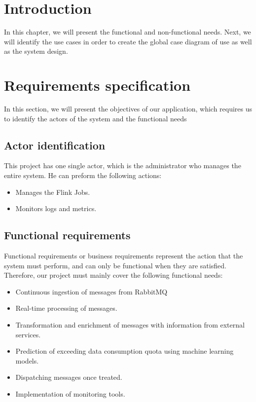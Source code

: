 
\section{Introduction}
In this chapter, we will present the functional and non-functional needs.
Next, we will identify the use cases in order to create the global case diagram of use as well as the system design.


\section{Requirements specification}

In this section, we will present the objectives of our application, which requires us to identify the actors of the system and the functional needs

\subsection{Actor identification}
This project has one single actor, which is the administrator who manages the entire system. He can preform the following actions:
\begin{itemize}
    \item[-] Manages the Flink Jobs.
    \item[-] Monitors logs and metrics.
\end{itemize}

\subsection{Functional requirements}

Functional requirements or business requirements represent the action that the system must perform, and can only be functional when they are satisfied.
Therefore, our project must mainly cover the following functional needs:
\begin{itemize}
    \item Continuous ingestion of messages from RabbitMQ
    \item Real-time processing of messages.
    \item Transformation and enrichment of messages with information from external services.
    \item Prediction of exceeding data consumption quota using machine learning models.
    \item Dispatching messages once treated.
    \item Implementation of monitoring tools.
\end{itemize}

